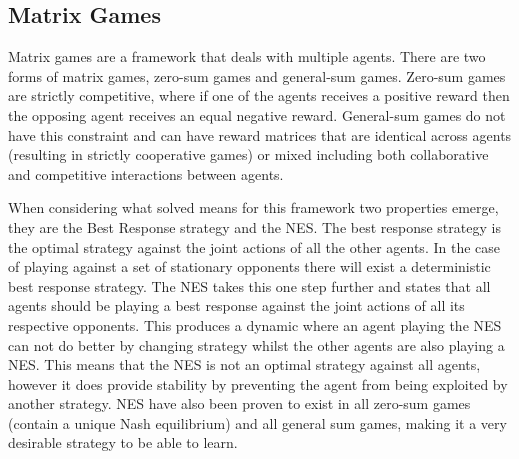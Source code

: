 \documentclass[conference]{IEEEtran}
\begin{document}
\subsection{Matrix Games} 
Matrix games are a framework that deals with multiple agents\cite{basar1999dynamic}. There are two forms of matrix games, zero-sum games and general-sum games. Zero-sum games are strictly competitive, where if one of the agents receives a positive reward then the opposing agent receives an equal negative reward. General-sum games do not have this constraint and can have reward matrices that are identical across agents (resulting in strictly cooperative games) or mixed including both collaborative and competitive interactions between agents. 

When considering what solved means for this framework two properties emerge, they are the Best Response strategy and the NES\cite{basar1999dynamic}. The best response strategy is the optimal strategy against the joint actions of all the other agents. In the case of playing against a set of stationary opponents there will exist a deterministic best response strategy. The NES takes this one step further and states that all agents should be playing a best response against the joint actions of all its respective opponents. This produces a dynamic where an agent playing the NES can not do better by changing strategy whilst the other agents are also playing a NES. This means that the NES is not an optimal strategy against all agents, however it does provide stability by preventing the agent from being exploited by another strategy. NES have also been proven to exist in all zero-sum games (contain a unique Nash equilibrium) and all general sum games, making it a very desirable strategy to be able to learn.
\end{document}
